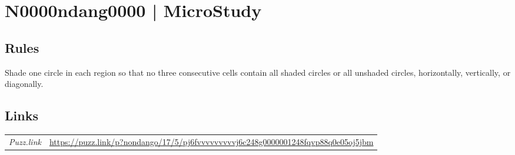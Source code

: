 \section[N0000ndang0000 | MicroStudy {[\emph{Nondango}]}]{N0000ndang0000 | {\normalfont MicroStudy}}
\label{sec:32-n0000ndang0000-microstudy}

\subsection*{Rules}
\begin{markdown}
Shade one circle in each region so that no three consecutive cells contain all shaded circles or all unshaded circles, horizontally, vertically, or diagonally.
\end{markdown}
\subsection*{Links}
\begin{tabularx}{\textwidth}{l X}
\emph{Puzz.link} & \url{https://puzz.link/p?nondango/17/5/pj6fvvvvvvvvvj6c248g0000001248fqvp88q0e05oj5jbm} \\
\end{tabularx}
\pagebreak
